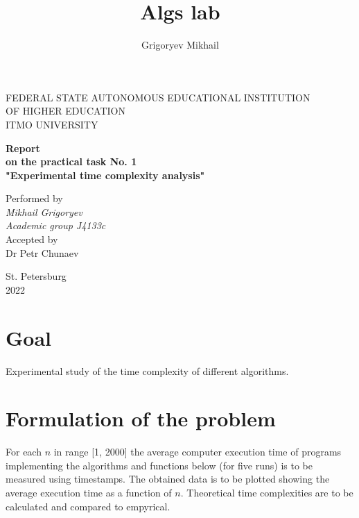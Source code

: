 \documentclass[12pt, a4paper]{article}
\author{Grigoryev Mikhail}
\title{Algs lab}
\begin{document}
\thispagestyle{empty}

\vspace{30mm}

\begin{center}
FEDERAL STATE AUTONOMOUS EDUCATIONAL INSTITUTION \\
OF HIGHER EDUCATION \\
ITMO UNIVERSITY

\vspace{40mm}

{\large \textbf{Report \\
on the practical task No. 1 \\
"Experimental time complexity analysis"}}
\end{center}

\vspace{15mm}

\begin{flushright}
{\large Performed by \\
\textit{Mikhail Grigoryev \\
Academic group J4133c \\}
Accepted by \\
Dr Petr Chunaev}
\end{flushright}

\vspace{100mm}

\begin{center}
St. Petersburg \\
2022
\end{center}

\newpage

\section*{Goal}

Experimental study of the time complexity of different algorithms.

\section*{Formulation of the problem}

For each $n$ in range [1, 2000] the average computer execution time of programs implementing the algorithms and functions below (for five runs) is to be measured using timestamps. The obtained data is to be plotted showing the average execution time as a function of $n$. Theoretical time complexities are to be calculated and compared to empyrical.
\end{document}
